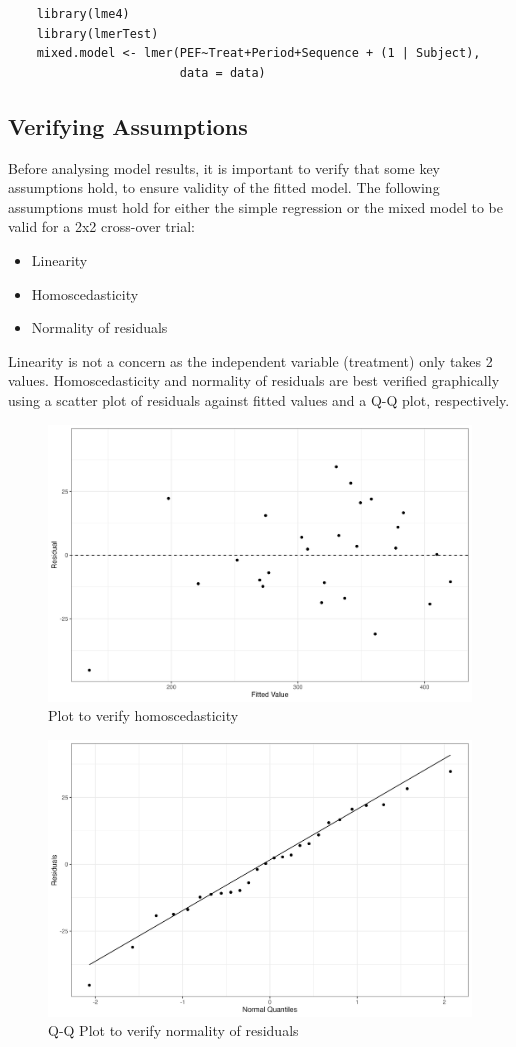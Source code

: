 \documentclass[12pt, TexShade, letterpaper]{report}
\begin{document}
\begin{verbatim}
    library(lme4)
    library(lmerTest)
    mixed.model <- lmer(PEF~Treat+Period+Sequence + (1 | Subject),
                        data = data)
\end{verbatim}

\subsection{Verifying Assumptions}\label{verifying-assumptions-subsection}
Before analysing model results, it is important to verify that some key assumptions hold, to ensure validity of the fitted model. The following assumptions must hold for either the simple regression or the mixed model to be valid for a 2x2 cross-over trial:
\begin{itemize}
    \item Linearity
    \item Homoscedasticity
    \item Normality of residuals
\end{itemize}
Linearity is not a concern as the independent variable (treatment) only takes 2 values. Homoscedasticity and normality of residuals are best verified graphically using a scatter plot of residuals against fitted values and a Q-Q plot, respectively.
\begin{figure}[ht]
    \centering
    \includegraphics[width=0.85\linewidth]{report/figures/ch3/homoscedasticity.png}
    \caption{Plot to verify homoscedasticity}
    \label{fig:homoscedasticity}
\end{figure}
\begin{figure}[ht]
    \centering
    \includegraphics[width=0.85\linewidth]{report/figures/ch3/qqplot.png}
    \caption{Q-Q Plot to verify normality of residuals}
    \label{fig:qqplot}
\end{figure}
\end{document}
